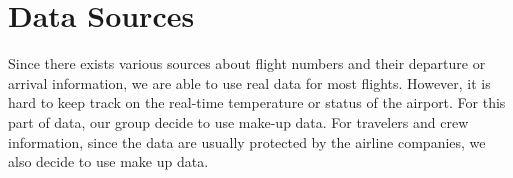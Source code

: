 \documentclass{article}
\begin{document}
	\section{Data Sources}
	Since there exists various sources about flight numbers and their departure or arrival information, we are able to use real data for most flights. However, it is hard to keep track on the real-time temperature or status of the airport. For this part of data, our group decide to use make-up data. For travelers and crew information, since the data are usually protected by the airline companies, we also decide to use make up data. 
	
\end{document}
